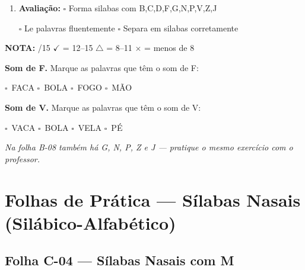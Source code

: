 \begin{exercicio}
\begin{enumerate}[resume]
  \item \textbf{Avaliação:} $\square$ Forma silabas com B,C,D,F,G,N,P,V,Z,J
  \begin{center}
  $\square$ Le palavras fluentemente \quad $\square$ Separa em silabas corretamente
  \end{center}
\end{enumerate}

\noindent\textbf{NOTA:} \underline{\hspace{1cm}}/15 \quad $\checkmark$ = 12--15 \quad $\triangle$ = 8--11 \quad $\times$ = menos de 8
\end{exercicio}

\begin{somletra}[title={\faMusic~Som das Letras F e V --- B\^onus (n\~ao vale nota)}]
\textbf{Som de F.} Marque as palavras que t\^e{}m o som de F:
\begin{center}
$\square$~FACA \quad $\square$~BOLA \quad $\square$~FOGO \quad $\square$~M\~AO
\end{center}

\textbf{Som de V.} Marque as palavras que t\^e{}m o som de V:
\begin{center}
$\square$~VACA \quad $\square$~BOLA \quad $\square$~VELA \quad $\square$~P\'E
\end{center}

\end{somletra}
\noindent\textit{Na folha B-08 tamb\'em h\'a G, N, P, Z e J --- pratique o mesmo exerc\'icio com o professor.}



\section{Folhas de Prática --- Sílabas Nasais (Silábico-Alfabético)}


\subsection{Folha C-04 --- Sílabas Nasais com M}


